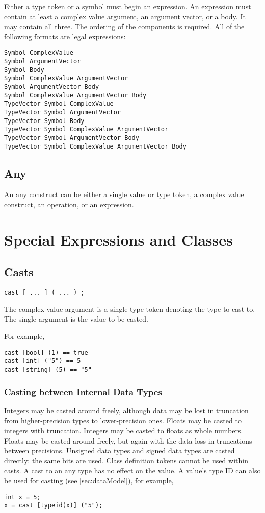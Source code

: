 \documentclass[10pt,a4paper]{article}
\begin{document}
Either a type token or a symbol must begin an expression. An expression must contain at least a complex value argument, an argument vector, or a body. It may contain all three. The ordering of the components is required. All of the following formats are legal expressions:
\begin{verbatim}
Symbol ComplexValue
Symbol ArgumentVector
Symbol Body
Symbol ComplexValue ArgumentVector
Symbol ArgumentVector Body
Symbol ComplexValue ArgumentVector Body
TypeVector Symbol ComplexValue
TypeVector Symbol ArgumentVector
TypeVector Symbol Body
TypeVector Symbol ComplexValue ArgumentVector
TypeVector Symbol ArgumentVector Body
TypeVector Symbol ComplexValue ArgumentVector Body
\end{verbatim}

\subsection{Any}
An any construct can be either a single value or type token, a complex value construct, an operation, or an expression.

\section{Special Expressions and Classes}
\subsection{Casts}
\begin{verbatim}
cast [ ... ] ( ... ) ;
\end{verbatim}

The complex value argument is a single type token denoting the type to cast to. The single argument is the value to be casted.

For example,
\begin{verbatim}
cast [bool] (1) == true
cast [int] ("5") == 5
cast [string] (5) == "5"
\end{verbatim}

\subsubsection{Casting between Internal Data Types}
Integers may be casted around freely, although data may be lost in truncation from higher-precision types to lower-precision ones. Floats may be casted to integers with truncation. Integers may be casted to floats as whole numbers. Floats may be casted around freely, but again with the data loss in truncations between precisions. Unsigned data types and signed data types are casted directly: the same bits are used. Class definition tokens cannot be used within casts. A cast to an any type has no effect on the value. A value's type ID can also be used for casting (see \ref{sec:dataModel}), for example,
\begin{verbatim}
int x = 5;
x = cast [typeid(x)] ("5");
\end{verbatim}
\end{document}
